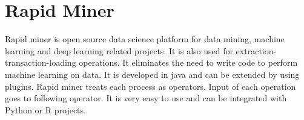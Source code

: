 \section{Rapid Miner}

Rapid miner is open source data science platform for data mining, machine
learning and deep learning related projects. It is also used for
extraction-transaction-loading operations. It eliminates the need to write code
to perform machine learning on data. It is developed in java and can be extended
 by using plugins.
Rapid miner treats each process as operators. Input of each operation goes to
following operator. It is very easy to use and can be integrated with Python or
R projects. \cite{hid-sp18-502-RapidMiner}



